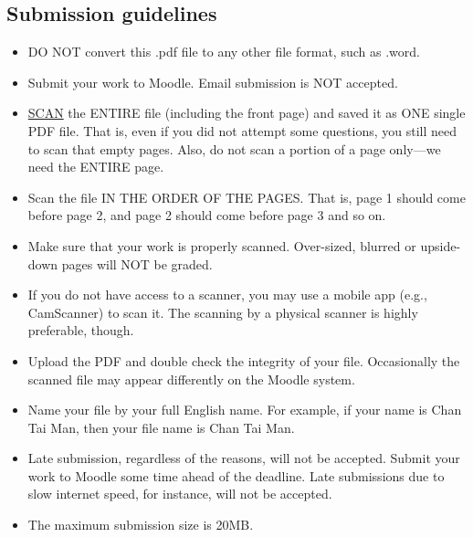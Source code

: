 \documentclass[letterpaper,10pt,addpoints]{exam}
\begin{document}
\subsection*{Submission guidelines}
\begin{itemize}
\item DO NOT convert this .pdf file to any other file format, such as .word.
\item Submit your work to Moodle. Email submission is NOT accepted. 
\item \underline{SCAN} the ENTIRE file (including the front page) and saved it as ONE single PDF file. That is, even if you did not attempt some questions, you still need to scan that empty pages. Also, do not scan a portion of a page only---we need the ENTIRE page. 
\item Scan the file IN THE ORDER OF THE PAGES. That is, page 1 should come before page 2, and page 2 should come before page 3 and so on. 
\item Make sure that your work is properly scanned. Over-sized, blurred or upside-down pages will NOT be graded.
\item If you do not have access to a scanner, you may use a mobile app (e.g., CamScanner) to scan it. The scanning by a physical scanner is highly preferable, though.  

\item Upload the PDF and double check the integrity of your file. Occasionally the scanned file may appear differently on the Moodle system.
\item Name your file by your full English name. For example, if your name is Chan Tai Man, then your file name is Chan Tai Man.
\item Late submission, regardless of the reasons, will not be accepted. Submit your work to Moodle some time ahead of the deadline. Late submissions due to slow internet speed, for instance, will not be accepted.
\item The maximum submission size is 20MB.
\end{itemize}
\end{document}
